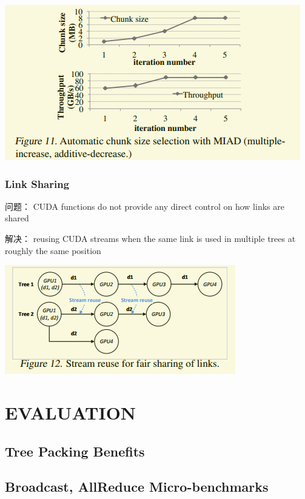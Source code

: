 \documentclass[11pt]{article}
\begin{document}
\begin{center}
\includegraphics[width=.9\linewidth]{Blink.org_imgs/20201111_203214_5JlRDc.png}
\end{center}
\subsubsection{Link Sharing}
\label{sec:orga80989d}
问题： CUDA functions do not provide any direct control on how links are shared

解决： reusing CUDA streams when the same link is used in multiple trees at roughly the same position
\begin{center}
\includegraphics[width=.9\linewidth]{Blink.org_imgs/20201111_203632_FViQuS.png}
\end{center}
\section{EVALUATION}
\label{sec:orgcb2165a}
\subsection{Tree Packing Benefits}
\label{sec:orgaaf5d5e}
\subsection{Broadcast, AllReduce Micro-benchmarks}
\label{sec:org6c5bb2e}
\end{document}

